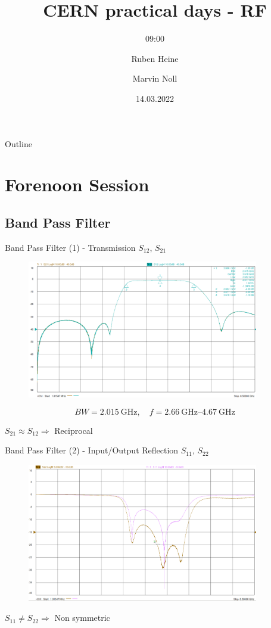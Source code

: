 \documentclass{beamer}
\title[Practical Days - RF]{CERN practical days - RF}
\subtitle{09:00}
\author[Heine, Noll]{Ruben Heine \and Marvin Noll}
\date[\today]{14.03.2022}
\begin{document}
\begin{frame}[plain]
  \titlepage
\end{frame}

\begin{frame}{Outline}
    \tableofcontents
\end{frame}

\section{Forenoon Session}
\subsection{Band Pass Filter}
\begin{frame}[t,fragile]{Band Pass Filter (1) - Transmission $S_{12}$, $S_{21}$}
\begin{figure}
  \centering
  \includegraphics[width=0.9\textwidth]{img/bandpass_S12.png}
\end{figure}
\begin{equation*}
BW=\SI{2.015}{\GHz},\quad f=\SIrange{2.66}{4.67}{\GHz}
\end{equation*}
\begin{center}
$S_{21} \approx S_{12} \Rightarrow$ Reciprocal
\end{center}
\end{frame}

\begin{frame}[t,fragile]{Band Pass Filter (2) - Input/Output Reflection $S_{11}$, $S_{22}$}
\begin{figure}
  \centering
  \includegraphics[width=0.9\textwidth]{img/bandpass_S11S22.png}
\end{figure}
\begin{center}
$S_{11} \neq S_{22} \Rightarrow$ Non symmetric
\end{center}
\end{frame}
\end{document}
